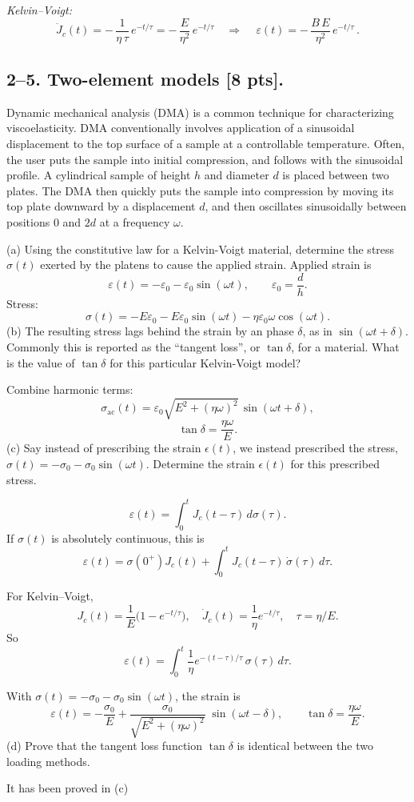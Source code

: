 \emph{Kelvin--Voigt:}
$$
\ddot J_c(t)=-\,\frac{1}{\eta\,\tau}\,e^{-t/\tau}
= -\,\frac{E}{\eta^{2}}\,e^{-t/\tau}
\quad\Rightarrow\quad
\,\varepsilon(t)=-\,\frac{B\,E}{\eta^{2}}\,e^{-t/\tau}\,.
$$
\bigskip
\subsection*{2--5. \textbf{Two-element models} [8 pts].}

Dynamic mechanical analysis (DMA) is a common technique for characterizing viscoelasticity. 
DMA conventionally involves application of a sinusoidal displacement to the top surface of a sample at a controllable temperature. 
Often, the user puts the sample into initial compression, and follows with the sinusoidal profile. 
A cylindrical sample of height $h$ and diameter $d$ is placed between two plates.
The DMA then quickly puts the sample into compression by moving its top plate downward by a displacement $d$, and then oscillates sinusoidally between positions $0$ and $2d$ at a frequency $\omega$.

\medskip
(a) Using the constitutive law for a Kelvin-Voigt material, determine the stress $\sigma(t)$ exerted by the platens to cause the applied strain. 
Applied strain is
$$
\varepsilon(t)=-\varepsilon_0-\varepsilon_0\sin(\omega t),\qquad \varepsilon_0=\frac{d}{h}.
$$
Stress:
$$
\sigma(t)=-E\varepsilon_0 - E\varepsilon_0\sin(\omega t) - \eta \varepsilon_0 \omega \cos(\omega t).
$$
\medskip
(b) The resulting stress lags behind the strain by an phase $\delta$, as in $\sin(\omega t + \delta)$. 
Commonly this is reported as the ``tangent loss'', or $\tan\delta$, for a material. 
What is the value of $\tan\delta$ for this particular Kelvin-Voigt model?

Combine harmonic terms:
$$
\sigma_{\text{ac}}(t)=\varepsilon_0\sqrt{E^2+(\eta\omega)^2}\,\sin(\omega t+\delta),
$$
$$
\tan\delta=\frac{\eta\omega}{E}.
$$
\medskip
(c) Say instead of prescribing the strain $\epsilon(t)$, we instead prescribed the stress, $\sigma(t) = - \sigma_0 - \sigma_0 \sin(\omega t)$. 
Determine the strain $\epsilon(t)$ for this prescribed stress.

$$
\varepsilon(t)=\int_{0}^{t} J_c(t-\tau)\,d\sigma(\tau).
$$
If $\sigma(t)$ is absolutely continuous, this is
$$
\varepsilon(t)=\sigma(0^+)J_c(t)+\int_{0}^{t} J_c(t-\tau)\,\dot\sigma(\tau)\,d\tau.
$$

For Kelvin--Voigt,
$$
J_c(t)=\frac{1}{E}\big(1-e^{-t/\tau}\big),\quad
\dot J_c(t)=\frac{1}{\eta}e^{-t/\tau},\quad \tau=\eta/E.
$$
So
$$
\varepsilon(t)=\int_{0}^{t}\frac{1}{\eta}e^{-(t-\tau)/\tau}\,\sigma(\tau)\,d\tau.
$$

With $\sigma(t)=-\sigma_0-\sigma_0\sin(\omega t)$,
the strain is
$$
\varepsilon(t)=-\frac{\sigma_0}{E}
+\frac{\sigma_0}{\sqrt{E^2+(\eta\omega)^2}}\;\sin(\omega t-\delta),
\qquad
\tan\delta=\frac{\eta\omega}{E}.
$$
\medskip
(d) Prove that the tangent loss function $\tan\delta$ is identical between the two loading methods.

It has been proved in (c)




